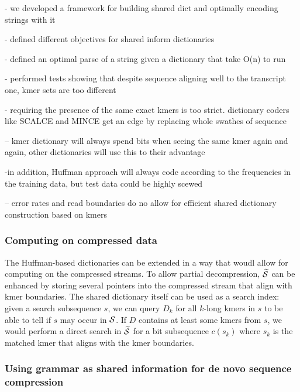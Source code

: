\documentclass[12pt]{cmuthesis}
\begin{document}
  - we developed a framework for building shared dict and optimally encoding strings with it

- defined different objectives for shared inform dictionaries

- defined an optimal parse of a string given a dictionary that take O(n) to run

- performed tests showing that despite sequence aligning well to the transcript one, kmer sets are too different

- requiring the presence of the same exact kmers is too strict. dictionary coders like SCALCE and MINCE get an edge by replacing whole swathes of sequence

-- kmer dictionary will always spend bits when seeing the same kmer again and again, other dictionaries will use this to their advantage


-in addition, Huffman approach will always code according to the frequencies in the training data, but test data could be highly scewed

-- error rates and read boundaries do no allow for efficient shared dictionary construction based on kmers


  \subsubsection{Computing on compressed data}


  The Huffman-based dictionaries can be extended in a way that woudl allow for computing on the compressed streams. To allow partial decompression, $\widetilde{\mathcal{S}}$ can be enhanced by storing several pointers into the compressed stream that align with kmer boundaries. The shared dictionary itself can be used as a search index: given a search subsequence $s$, we can query $D_k$ for all $k$-long kmers in $s$ to be able to tell if $s$ may occur in $\mathcal{S}$. If $D$ contains at least some kmers from $s$, we would perform a direct search in $\widetilde{\mathcal{S}}$ for a bit subsequence $c(s_k)$ where $s_k$ is the matched kmer that aligns with the kmer boundaries.

  \subsubsection{Using grammar as shared information for de novo sequence compression}
\end{document}
